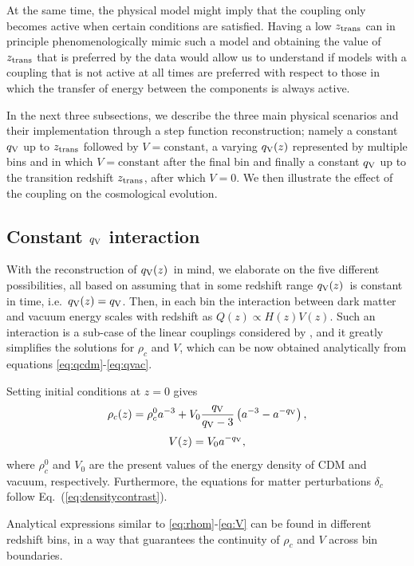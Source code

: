 \documentclass[a4paper,fleqn,usenatbib]{mnras}
\newcommand*{\qv}{$q_{\rm V}(z)$}
\begin{document}
At the same time, the physical model might imply that the coupling only becomes active when certain conditions are satisfied. Having a low $z_{\rm trans}$ can in principle phenomenologically mimic such a model and obtaining the value of $z_{\rm trans}$ that is preferred by the data would allow us to understand if models with a coupling that is not active at all times are preferred with respect to those in which the transfer of energy between the components is always active.

In the next three subsections, we describe the three main physical scenarios and their implementation through a step function reconstruction; namely a constant $q_{\rm V}$ up to $z_{\rm trans}$ followed by $V=\text{constant}$, a varying $q_{\rm V}(z) $ represented by multiple bins and in which $V=\text{constant}$ after the final bin and finally a constant $q_{\rm V}$ up to the transition redshift $z_{\rm trans}$, after which $V=0$. We then illustrate the effect of the coupling on the cosmological evolution.

\subsection{Constant $q_{\rm V}$ interaction}\label{subsec:const}
With the reconstruction of \qv\ in mind, we elaborate on the five different possibilities, all based on assuming that in some redshift range \qv\ is constant in time, i.e.\ $q_{\rm V}(z)=q_{\rm V}$. Then, in each bin the interaction between dark matter and vacuum energy scales with redshift as $Q(z)\propto H(z)V(z)$. Such an interaction is a sub-case of the linear couplings considered by \cite{Quercellini2008}, and it  greatly simplifies the solutions for $\rho_c$ and $V$, which can be now obtained analytically from equations \eqref{eq:qcdm}-\eqref{eq:qvac}.

Setting initial conditions at $z=0$ gives
\begin{equation}
\label{eq:rhom}
\rho_c(z)=\rho_c^0a^{-3}+V_0 \frac{q_{\rm V}}{q_{\rm V}-3}\left(a^{-3}-a^{-q_{\rm V}}\right),
\end{equation}
\begin{equation}\label{eq:V}
V(z)=V_0a^{-q_{\rm V}},
\end{equation}
where $\rho_{c}^0$ and $V_0$ are the present values of the energy density of CDM and vacuum, respectively. Furthermore, the equations for matter perturbations $\delta_c$ follow Eq.~(\ref{eq:densitycontrast}).

Analytical expressions similar to \eqref{eq:rhom}-\eqref{eq:V} can be found in different redshift bins, in a way that guarantees the continuity of $\rho_c$ and $V$ across bin boundaries.
\end{document}
